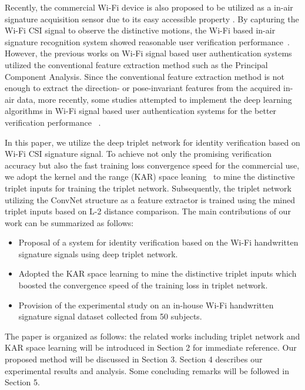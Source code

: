 \documentclass[runningheads]{llncs}
\begin{document}
Recently, the commercial Wi-Fi device is also proposed to be utilized as a in-air signature acquisition sensor due to its easy accessible property \cite{moon2017air}. By capturing the Wi-Fi CSI signal to observe the distinctive motions, the Wi-Fi based in-air signature recognition system showed reasonable user verification performance~\cite{moon2017air}. However, the previous works on Wi-Fi signal based user authentication systems~\cite{hong2016wfid,moon2017air} utilized the conventional feature extraction method such as the Principal Component Analysis. Since the conventional feature extraction method is not enough to extract the direction- or pose-invariant features from the acquired in-air data, more recently, some studies attempted to implement the deep learning algorithms in Wi-Fi signal based user authentication systems for the better verification performance ~\cite{shi2017smart,pokkunuru2018neuralwave}. 

In this paper, we utilize the deep triplet network for identity verification based on Wi-Fi CSI signature signal. To achieve not only the promising verification accuracy but also the fast training loss convergence speed for the commercial use, we adopt the kernel and the range (KAR) space leaning~\cite{toh100,toh2018learning,toh2018analytic,toh2018gradient} to mine the distinctive triplet inputs for training the triplet network. Subsequently, the triplet network utilizing the ConvNet structure as a feature extractor is trained using the mined triplet inputs based on L-2 distance comparison.
The main contributions of our work can be summarized as follows:
\begin{itemize}
\item Proposal of a system for identity verification based on the Wi-Fi handwritten signature signals using deep triplet network.
\item Adopted the KAR space learning to mine the distinctive triplet inputs which boosted the convergence speed of the training loss in triplet network.
\item Provision of the experimental study on an in-house Wi-Fi handwritten signature signal dataset collected from 50 subjects.
\end{itemize}

The paper is organized as follows: the related works including triplet network and KAR space learning will be introduced in Section 2 for immediate reference. Our proposed method will be discussed in Section 3. Section 4 describes our experimental results and analysis. Some concluding remarks will be followed in Section 5.
\end{document}
